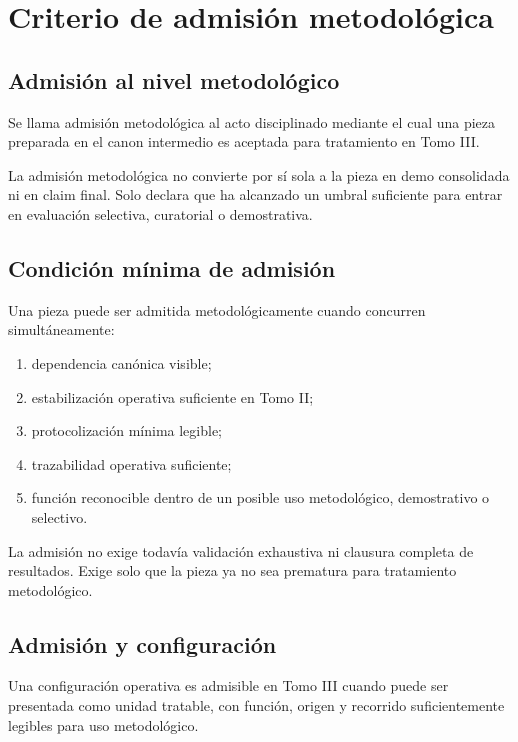 \chapter{Criterio de admisión metodológica}

\section{Admisión al nivel metodológico}
\begin{definition}
Se llama admisión metodológica al acto disciplinado mediante el cual una pieza preparada en el canon intermedio es aceptada para tratamiento en Tomo III.
\end{definition}

\begin{observation}
La admisión metodológica no convierte por sí sola a la pieza en demo consolidada ni en claim final. Solo declara que ha alcanzado un umbral suficiente para entrar en evaluación selectiva, curatorial o demostrativa.
\end{observation}

\section{Condición mínima de admisión}
\begin{definition}
Una pieza puede ser admitida metodológicamente cuando concurren simultáneamente:
\begin{enumerate}
  \item dependencia canónica visible;
  \item estabilización operativa suficiente en Tomo II;
  \item protocolización mínima legible;
  \item trazabilidad operativa suficiente;
  \item función reconocible dentro de un posible uso metodológico, demostrativo o selectivo.
\end{enumerate}
\end{definition}

\begin{observation}
La admisión no exige todavía validación exhaustiva ni clausura completa de resultados. Exige solo que la pieza ya no sea prematura para tratamiento metodológico.
\end{observation}

\section{Admisión y configuración}
\begin{definition}
Una configuración operativa es admisible en Tomo III cuando puede ser presentada como unidad tratable, con función, origen y recorrido suficientemente legibles para uso metodológico.
\end{definition}

